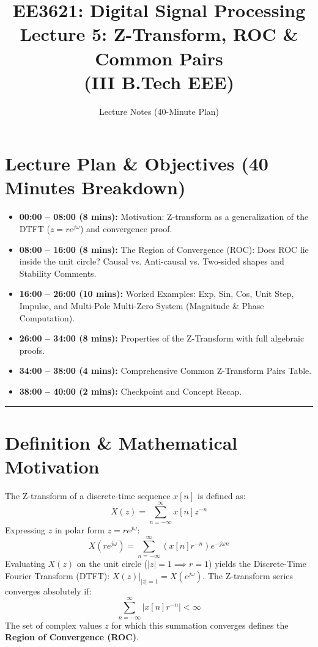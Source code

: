 \documentclass[11pt,a4paper]{article}
\title{\textbf{EE3621: Digital Signal Processing} \\ \Large Lecture 5: Z-Transform, ROC \& Common Pairs \\ \large (III B.Tech EEE)}
\author{Lecture Notes (40-Minute Plan)}
\date{}
\begin{document}
\maketitle

\section{Lecture Plan \& Objectives (40 Minutes Breakdown)}
\begin{itemize}
    \item \textbf{00:00 -- 08:00 (8 mins):} Motivation: Z-transform as a generalization of the DTFT ($z = r e^{j\omega}$) and convergence proof.
    \item \textbf{08:00 -- 16:00 (8 mins):} The Region of Convergence (ROC): Does ROC lie inside the unit circle? Causal vs. Anti-causal vs. Two-sided shapes and Stability Comments.
    \item \textbf{16:00 -- 26:00 (10 mins):} Worked Examples: Exp, Sin, Cos, Unit Step, Impulse, and Multi-Pole Multi-Zero System (Magnitude \& Phase Computation).
    \item \textbf{26:00 -- 34:00 (8 mins):} Properties of the Z-Transform with full algebraic proofs.
    \item \textbf{34:00 -- 38:00 (4 mins):} Comprehensive Common Z-Transform Pairs Table.
    \item \textbf{38:00 -- 40:00 (2 mins):} Checkpoint and Concept Recap.
\end{itemize}

\noindent\rule{\textwidth}{0.5pt}

\section{Definition \& Mathematical Motivation}
The Z-transform of a discrete-time sequence $x[n]$ is defined as:
\begin{equation}
X(z) = \sum_{n=-\infty}^{\infty} x[n] z^{-n}
\end{equation}
Expressing $z$ in polar form $z = r e^{j\omega}$:
\begin{equation}
X(r e^{j\omega}) = \sum_{n=-\infty}^{\infty} (x[n] r^{-n}) e^{-j\omega n}
\end{equation}
Evaluating $X(z)$ on the unit circle ($|z|=1 \implies r=1$) yields the Discrete-Time Fourier Transform (DTFT): $X(z)\Big|_{|z|=1} = X(e^{j\omega})$.
The Z-transform series converges absolutely if:
\begin{equation}
\sum_{n=-\infty}^{\infty} |x[n] r^{-n}| < \infty
\end{equation}
The set of complex values $z$ for which this summation converges defines the \textbf{Region of Convergence (ROC)}.
\end{document}
